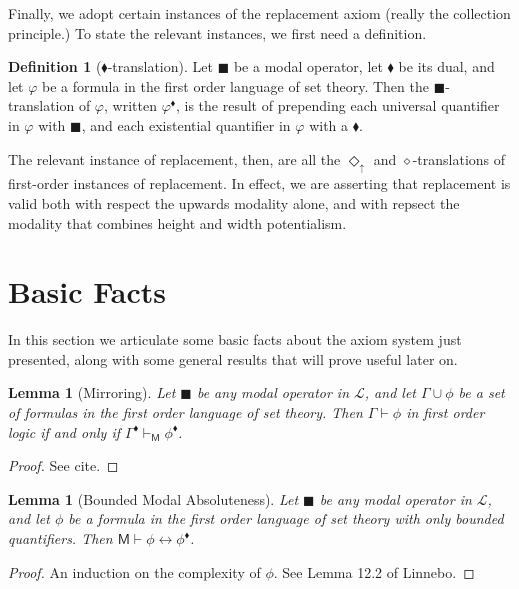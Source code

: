 \documentclass{article}
\newtheorem{Lemma}[Theorem]{Lemma}
\theoremstyle{definition}
\newtheorem{Definition}[Theorem]{Definition}
\newcommand{\du}{\Diamond_\uparrow}
\begin{document}
Finally, we adopt certain instances of the replacement axiom (really the 
collection principle.) To state the relevant instances, we first need a definition.

\begin{Definition}[$\blacklozenge$-translation]
    Let $\blacksquare$ be a modal operator, let $\blacklozenge$ be its dual, and let 
    $\varphi$ be a formula in the first order language of set theory. 
    Then the $\blacksquare$-translation of $\varphi$, written $\varphi^\blacklozenge$, 
    is the result of prepending each universal quantifier in $\varphi$ with $\blacksquare$,
    and each existential quantifier in $\varphi$ with a $\blacklozenge$.
\end{Definition}

The relevant instance of replacement, then, are all the $\du$ and $\diamond$-translations 
of first-order instances of replacement. In effect, we are asserting that replacement 
is valid both with respect the upwards modality alone, and with repsect the modality 
that combines height and width potentialism.

\section{Basic Facts}
In this section we articulate some basic facts about the axiom system just presented, 
along with some general results that will prove useful later on. 

\begin{Lemma}[Mirroring]
    Let $\blacksquare$ be any modal operator in $\mathcal{L}$, and let $\Gamma 
    \cup {\phi}$ be a set of formulas in the first order language of set theory. Then
    $\Gamma \vdash \phi$ in first order logic if and only if 
    $\Gamma^\blacklozenge \vdash_\mathsf{M} \phi^\blacklozenge$.
\end{Lemma}
\begin{proof}
    See cite.
\end{proof}

\begin{Lemma}[Bounded Modal Absoluteness]\label{BMA}
    Let $\blacksquare$ be any modal operator in $\mathcal{L}$, and let $\phi$ be 
    a formula in the first order language of set theory
    with only bounded quantifiers. Then
    $\mathsf{M} \vdash \phi \leftrightarrow \phi^\blacklozenge$.
\end{Lemma}
\begin{proof}
    An induction on the complexity of $\phi$. See Lemma 12.2 of Linnebo.
\end{proof}
\end{document}
